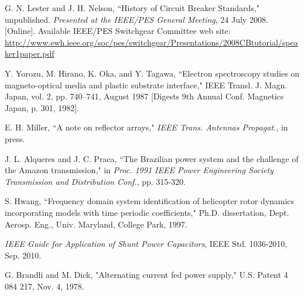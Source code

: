 \documentclass[conference]{IEEEtran}
\begin{document}
\begin{thebibliography}{16}
G. N. Lester and J. H. Nelson, ``History of Circuit Breaker Standards," unpublished.  \emph{Presented at the IEEE/PES General Meeting}, 24 July 2008. [Online]. Available IEEE/PES Switchgear Committee web site: \url{http://www.ewh.ieee.org/soc/pes/switchgear/Presentations/2008CBtutorial/speaker1paper.pdf}

Y. Yorozu, M. Hirano, K. Oka, and Y. Tagawa, ``Electron spectroscopy studies on magneto-optical media and plastic substrate interface," IEEE Transl. J. Magn. Japan, vol. 2, pp. 740–741, August 1987 [Digests 9th Annual Conf. Magnetics Japan, p. 301, 1982].

E. H. Miller, ``A note on reflector arrays," \emph{IEEE Trans. Antennas Propagat.}, in press.

J. L. Alqueres and J. C. Praca, ``The Brazilian power system and the challenge of the Amazon transmission," in \emph{Proc. 1991 IEEE Power Engineering Society Transmission and Distribution Conf.}, pp. 315-320.

S. Hwang, ``Frequency domain system identification of helicopter rotor dynamics incorporating models with time periodic coefficients," Ph.D. dissertation, Dept. Aerosp. Eng., Univ. Maryland, College Park, 1997.

\emph{IEEE Guide for Application of Shunt Power Capacitors}, IEEE Std. 1036-2010, Sep. 2010.

G. Brandli and M. Dick, "Alternating current fed power supply," U.S. Patent 4 084 217, Nov. 4, 1978.


\end{thebibliography}




\end{document}
